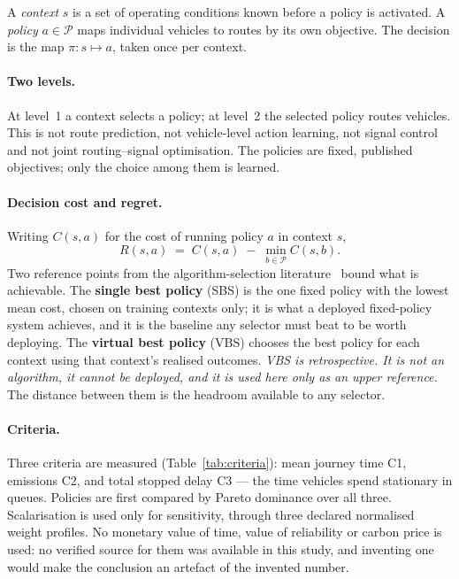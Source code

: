 A \emph{context} $s$ is a set of operating conditions known before a policy is
activated. A \emph{policy} $a \in \mathcal{P}$ maps individual vehicles to
routes by its own objective. The decision is the map $\pi: s \mapsto a$, taken
once per context.

\paragraph{Two levels.} At level~1 a context selects a policy; at level~2 the
selected policy routes vehicles. This is not route prediction, not
vehicle-level action learning, not signal control and not joint
routing--signal optimisation. The policies are fixed, published objectives;
only the choice among them is learned.

\paragraph{Decision cost and regret.} Writing $C(s,a)$ for the cost of running
policy $a$ in context $s$,
\begin{equation}
R(s,a) \;=\; C(s,a) \;-\; \min_{b \in \mathcal{P}} C(s,b).
\end{equation}
Two reference points from the algorithm-selection literature~\cite{bischl2016aslib}
bound what is achievable. The \textbf{single best policy} (SBS) is the one
fixed policy with the lowest mean cost, chosen on training contexts only; it is
what a deployed fixed-policy system achieves, and it is the baseline any
selector must beat to be worth deploying. The \textbf{virtual best policy}
(VBS) chooses the best policy for each context using that context's realised
outcomes. \emph{VBS is retrospective. It is not an algorithm, it cannot be
deployed, and it is used here only as an upper reference.} The distance between
them is the headroom available to any selector.

\paragraph{Criteria.} Three criteria are measured (Table~\ref{tab:criteria}):
mean journey time C1, \CO{} emissions C2, and total stopped delay C3 --- the
time vehicles spend stationary in queues. Policies are first compared by Pareto
dominance over all three. Scalarisation is used only for sensitivity, through
three declared normalised weight profiles. No monetary value of time, value of
reliability or carbon price is used: no verified source for them was available
in this study, and inventing one would make the conclusion an artefact of the
invented number.

